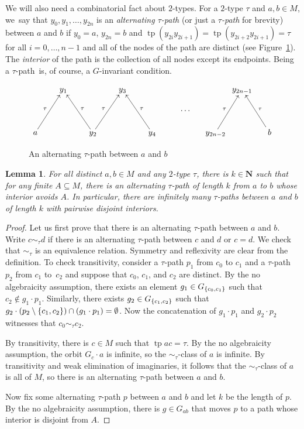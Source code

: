 \documentclass[11pt]{article}
\newcommand{\yu}{\makebox[3pt][c]{$y_1$}}
\newcommand{\yt}{\makebox[3pt][c]{$y_3$}}
\newcommand{\ym}{\makebox[3pt][c]{$y_{2n-1}$}}
\newcommand{\yn}{\makebox[2pt][c]{$y_{2n-2}$}}
\let\sub\subseteq
\theoremstyle{plain}
\newtheorem{lemma}[theorem]{Lemma}
\theoremstyle{definition}
\newcommand{\N}{{\mathbf N}}
\DeclareMathOperator{\tp}{tp}
\DeclarePairedDelimiter\set{\{}{\}}
\begin{document}
We will also need a combinatorial fact about $2$-types. For a $2$-type $\tau$ and \hbox{$a, b\!\in\!M$}, we~say that $y_0, y_1, \ldots, y_{2n}$ is an \emph{alternating $\tau$-path} (or just a \emph{$\tau$-path} for brevity) between $a$ and $b$ if $y_0=a$, $y_{2n}=b$ and $\tp(y_{2i} y_{2i+1}) = \tp(y_{2i+2} y_{2i+1}) = \tau$ for all $i = 0, \ldots, n-1$ and all of the nodes of the path are distinct (see Figure~\ref{fig:tau-path}). The \emph{interior} of the path is the collection of all nodes except its endpoints. Being a $\tau$-path~is, of course, a $G$-invariant condition.

\begin{figure}[htb]
\[
\xymatrix@R=.5cm{
&\yu&&\yt&&&&\ym&\\&&&&&\cdots&&&\\
a\ar[uur]^\tau&&y_2\ar[uul]_\tau\ar[uur]^\tau&&y_4\ar[uul]_\tau&&\yn
\ar[uur]^\tau&&b\ar[uul]_\tau
}
\]
\caption{An alternating $\tau$-path between $a$ and $b$} \label{fig:tau-path}
\end{figure}

\begin{lemma}
\label{Lem:connections}
For all distinct $a, b\in M$ and any $2$-type $\tau$, there is $k \in \N$ such that for any finite $A \sub M$, there is an alternating $\tau$-path of length $k$ from $a$ to $b$ whose interior avoids $A$. In particular, there are infinitely many $\tau$-paths between $a$ and $b$ of length $k$ with pairwise disjoint interiors.
\end{lemma}
\begin{proof}
Let us first prove that there is an alternating $\tau$-path between $a$ and $b$.
Write $c \sim_\tau d$ if there is an alternating $\tau$-path between $c$ and $d$ or $c = d$. We check that $\sim_\tau$ is an equivalence relation. Symmetry and reflexivity are clear from the definition. To check transitivity, consider a $\tau$-path $p_1$ from $c_0$ to $c_1$ and a $\tau$-path $p_2$ from $c_1$ to~$c_2$ and suppose that $c_0$, $c_1$, and $c_2$ are distinct. By the no algebraicity assumption, there exists an element $g_1 \in G_{\set{c_0, c_1}}$ such that $c_2 \notin g_1 \cdot p_1$. Similarly, there exists $g_2 \in G_{\set{c_1, c_2}}$ such that $g_2 \cdot (p_2 \setminus \set{c_1, c_2}) \cap (g_1 \cdot p_1) = \emptyset$. Now the concatenation of $g_1 \cdot p_1$ and $g_2 \cdot p_2$ witnesses that $c_0 \sim_\tau c_2$.

By transitivity, there is $c \in M$ such that $\tp ac = \tau$. By the no algebraicity assumption, the orbit $G_c \cdot a$ is infinite, so the $\sim_\tau$-class of $a$ is infinite. By transitivity and weak elimination of imaginaries, it follows that the $\sim_\tau$-class of $a$ is all of $M$, so there is an alternating $\tau$-path between $a$ and $b$.

Now fix some alternating $\tau$-path $p$ between $a$ and $b$ and let $k$ be the length of $p$. By the no algebraicity assumption, there is $g \in G_{ab}$ that moves $p$ to a path whose interior is disjoint from $A$.
\end{proof}
\end{document}
